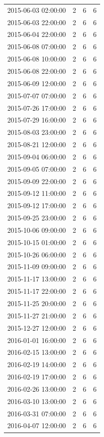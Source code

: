 \begin{tabular}{lrrr}
2015-06-03 02:00:00 & 2 & 6 & 6 \\
2015-06-03 22:00:00 & 2 & 6 & 6 \\
2015-06-04 22:00:00 & 2 & 6 & 6 \\
2015-06-08 07:00:00 & 2 & 6 & 6 \\
2015-06-08 10:00:00 & 2 & 6 & 6 \\
2015-06-08 22:00:00 & 2 & 6 & 6 \\
2015-06-09 12:00:00 & 2 & 6 & 6 \\
2015-07-07 07:00:00 & 2 & 6 & 6 \\
2015-07-26 17:00:00 & 2 & 6 & 6 \\
2015-07-29 16:00:00 & 2 & 6 & 6 \\
2015-08-03 23:00:00 & 2 & 6 & 6 \\
2015-08-21 12:00:00 & 2 & 6 & 6 \\
2015-09-04 06:00:00 & 2 & 6 & 6 \\
2015-09-05 07:00:00 & 2 & 6 & 6 \\
2015-09-09 22:00:00 & 2 & 6 & 6 \\
2015-09-12 11:00:00 & 2 & 6 & 6 \\
2015-09-12 17:00:00 & 2 & 6 & 6 \\
2015-09-25 23:00:00 & 2 & 6 & 6 \\
2015-10-06 09:00:00 & 2 & 6 & 6 \\
2015-10-15 01:00:00 & 2 & 6 & 6 \\
2015-10-26 06:00:00 & 2 & 6 & 6 \\
2015-11-09 09:00:00 & 2 & 6 & 6 \\
2015-11-17 13:00:00 & 2 & 6 & 6 \\
2015-11-17 22:00:00 & 2 & 6 & 6 \\
2015-11-25 20:00:00 & 2 & 6 & 6 \\
2015-11-27 21:00:00 & 2 & 6 & 6 \\
2015-12-27 12:00:00 & 2 & 6 & 6 \\
2016-01-01 16:00:00 & 2 & 6 & 6 \\
2016-02-15 13:00:00 & 2 & 6 & 6 \\
2016-02-19 14:00:00 & 2 & 6 & 6 \\
2016-02-19 17:00:00 & 2 & 6 & 6 \\
2016-02-26 13:00:00 & 2 & 6 & 6 \\
2016-03-10 13:00:00 & 2 & 6 & 6 \\
2016-03-31 07:00:00 & 2 & 6 & 6 \\
2016-04-07 12:00:00 & 2 & 6 & 6 \\

\end{tabular}
